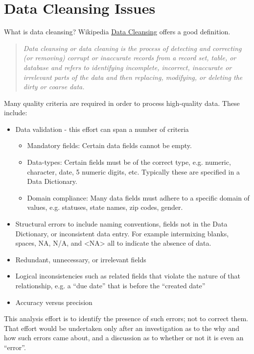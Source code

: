 \documentclass[12pt, titlepage]{article}
\begin{document}
\section{Data Cleansing Issues} 
\label{sec:issues}
What is data cleansing?  Wikipedia 
\href{https://en.wikipedia.org/wiki/Data_cleansing}{Data Cleansing} offers a good definition. 

\begin{quote}\textit{Data cleansing or data cleaning is the process of detecting and 
correcting (or removing) corrupt or inaccurate records from a record set, 
table, or database and refers to identifying incomplete, incorrect, 
inaccurate or irrelevant parts of the data and then replacing, 
modifying, or deleting the dirty or coarse data.}
\end{quote}

Many quality criteria are required in order to process high-quality 
data. These include:

\begin{itemize}
	\item Data validation - this effort can span a number of criteria
	\begin{itemize}
		\item Mandatory fields: Certain data fields cannot be empty.
		\item Data-types: Certain fields must be of the correct type, e.g. numeric, 
		character, date, 5 numeric digits, etc. Typically these are specified 
		in a Data Dictionary.
		\item Domain compliance:  Many data fields must adhere to a specific 
		domain of values, e.g. statuses, state names, zip codes, gender. 
	\end{itemize}   
	\item Structural errors to include naming conventions, 
	 fields not in the Data Dictionary, or inconsistent data entry. For example 
	 intermixing blanks, spaces, NA, N/A, and \textless{}NA\textgreater{} 
	 all to indicate the absence of data.
	\item Redundant, unnecessary, or irrelevant fields
	\item Logical inconsistencies such as related fields that violate the 
	nature of that relationship, e.g. a ``due date'' that is before the ``created date''
	\item Accuracy versus precision
\end{itemize}

This analysis effort is to identify the presence of such errors; not to correct them. 
That effort would be undertaken only after an investigation as to the why
and how such errors came about, and a discussion as to whether or not it 
is even an ``error''. 
\end{document}
